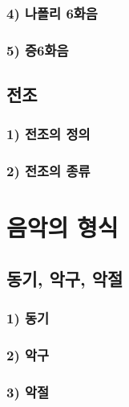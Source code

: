 \documentclass[12pt, a4paper, oneside]{book}
\let\stdsection\section
\renewcommand\section{\newpage\stdsection}
\begin{document}
	\subsection{4) 나폴리 6화음}

	\subsection{5) 증6화음}

%
	\section{전조}

	\subsection{1) 전조의 정의}

	\subsection{2) 전조의 종류}




	\chapter{음악의 형식}
	\noptcrule
	\parttoc				

	\section{동기, 악구, 악절}

	\subsection{1) 동기}

	\subsection{2) 악구}

	\subsection{3) 악절}
\end{document}
